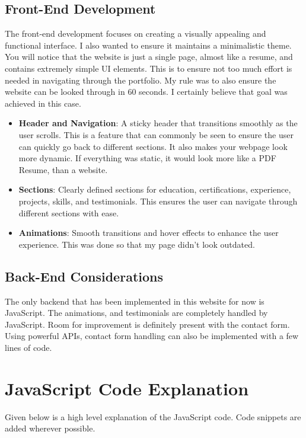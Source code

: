 \documentclass[15pt]{report}
\begin{document}
\section{Front-End Development}
The front-end development focuses on creating a visually appealing and functional interface. I also wanted to ensure it maintains a minimalistic theme. You will notice that the website is just a single page, almost like a resume, and contains extremely simple UI elements. This is to ensure not too much effort is needed in navigating through the portfolio. My rule was to also ensure the website can be looked through in 60 seconds. I certainly believe that goal was achieved in this case. 
\begin{itemize}
    \item \textbf{Header and Navigation}: A sticky header that transitions smoothly as the user scrolls. This is a feature that can commonly be seen to ensure the user can quickly go back to different sections. It also makes your webpage look more dynamic. If everything was static, it would look more like a PDF Resume, than a website. 
    \item \textbf{Sections}: Clearly defined sections for education, certifications, experience, projects, skills, and testimonials. This ensures the user can navigate through different sections with ease. 
    \item \textbf{Animations}: Smooth transitions and hover effects to enhance the user experience. This was done so that my page didn't look outdated.
\end{itemize}

\section{Back-End Considerations}
The only backend that has been implemented in this website for now is JavaScript. The animations, and testimonials are completely handled by JavaScript. Room for improvement is definitely present with the contact form. Using powerful APIs, contact form handling can also be implemented with a few lines of code. 

\chapter{JavaScript Code Explanation}

Given below is a high level explanation of the JavaScript code. Code snippets are added wherever possible. 
\end{document}

